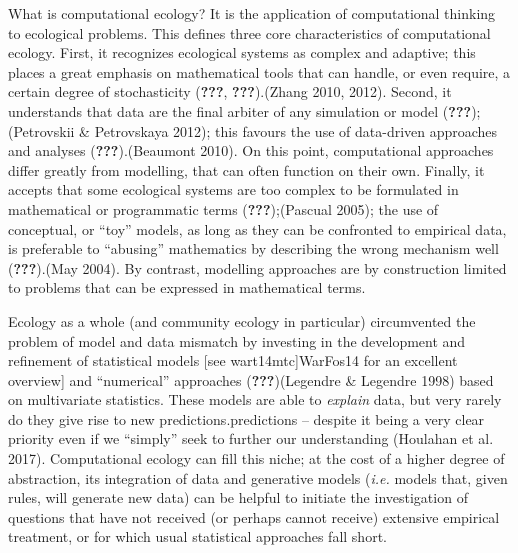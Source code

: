 \documentclass[11pt,serif]{article}
\begin{document}
What is computational ecology? It is the application of computational
thinking to ecological problems. This defines three core characteristics
of computational ecology. First, it recognizes ecological systems as
complex and adaptive; this places a great emphasis on mathematical tools
that can handle, or even require, a certain degree of stochasticity
\color{gray}({\textbf{???}},
{\textbf{???}}).\color{black}\color{purple}(Zhang 2010,
2012).\color{black} Second, it understands that data are the final
arbiter of any simulation or model
\color{gray}({\textbf{???}});\color{black}\color{purple}(Petrovskii \&
Petrovskaya 2012);\color{black} this favours the use of data-driven
approaches and analyses
\color{gray}({\textbf{???}}).\color{black}\color{purple}(Beaumont 2010).
On this point,\color{black} \color{purple}computational approaches
differ greatly from modelling, that can often function\color{black}
\color{purple}on their own.\color{black} Finally, it accepts that some
ecological systems are too complex to be formulated in mathematical or
programmatic terms
\color{gray}({\textbf{???}});\color{black}\color{purple}(Pascual
2005);\color{black} the use of conceptual, or ``toy'' models, as long as
they can be confronted to empirical data, is preferable to ``abusing''
mathematics by describing the wrong mechanism well
\color{gray}({\textbf{???}}).\color{black}\color{purple}(May 2004). By
contrast, modelling approaches are by construction limited
to\color{black} \color{purple}problems that can be expressed in
mathematical terms.\color{black}

Ecology as a whole (and community ecology in particular) circumvented
the problem of model and data mismatch by investing in the development
and refinement of statistical models {[}see
\color{gray}{[}wart14mtc{]}\color{black}\color{purple}WarFos14\color{black}
for an excellent overview{]} and ``numerical'' approaches
\color{gray}({\textbf{???}})\color{black}\color{purple}(Legendre \&
Legendre 1998)\color{black} based on multivariate statistics. These
models are able to \emph{explain} data, but very rarely do they give
rise to new
\color{gray}predictions.\color{black}\color{purple}predictions --
despite it being a very clear priority even if we ``simply''
seek\color{black} \color{purple}to further our understanding (Houlahan
et al. 2017).\color{black} Computational ecology can fill this niche; at
the cost of a higher degree of abstraction, its integration of data and
generative models (\emph{i.e.} models that, given rules, will generate
new data) can be helpful to initiate the investigation of questions that
have not received (or perhaps cannot receive) extensive empirical
treatment, or for which usual statistical approaches fall short.
\end{document}

